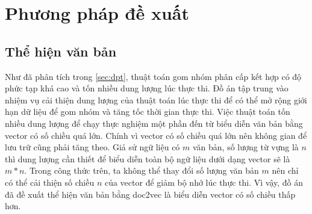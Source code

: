 \chapter{Phương pháp đề xuất}
\label{Chapter3}

%

\section{Thể hiện văn bản}
Như đã phân tích trong \ref{sec:dpt}, thuật toán gom nhóm phân cấp kết hợp có độ phức tạp khá cao và tốn nhiều dung lượng lúc thực thi.
Đồ án tập trung vào nhiệm vụ cải thiện dung lượng của thuật toán lúc thực thi để có thể mở rộng giới hạn dữ liệu để gom nhóm và tăng tốc thời gian thực thi.
Việc thuật toán tốn nhiều dung lượng để chạy thực nghiệm một phần đến từ biểu diễn văn bản bằng vector có số chiều quá lớn.
Chính vì vector có số chiều quá lớn nên không gian để lưu trữ cũng phải tăng theo.
Giả sử ngữ liệu có $m$ văn bản, số lượng từ vựng là $n$ thì dung lượng cần thiết để biểu diễn toàn bộ ngữ liệu dưới dạng vector sẽ là $m * n$.
Trong công thức trên, ta không thể thay đổi số lượng văn bản $m$ nên chỉ có thể cải thiện số chiều $n$ của vector để giảm bộ nhớ lúc thực thi.
Vì vậy, đồ án đã đề xuất thể hiện văn bản bằng doc2vec là biểu diễn vector có số chiều thấp hơn.


